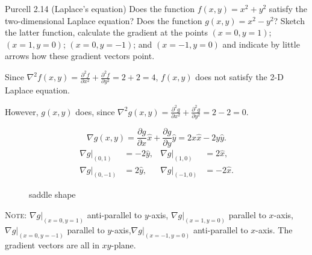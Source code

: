 \documentclass{esg8022pset}
\begin{document}
\begin{problem}{Purcell 2.14 (Laplace's equation)}
  Does the function $f(x, y) = x^2 + y^2$ satisfy the two-dimensional
  Laplace equation? Does the function $g(x, y) = x^2 - y^2$? 
  Sketch the latter function, calculate the gradient at the points $(x = 0, y = 1)$;
  $(x = 1, y = 0)$; $(x = 0, y = -1)$; and $(x = -1, y = 0)$ and indicate
  by little arrows how these gradient vectors point.  
\end{problem}
\begin{solution}
  Since $\nabla^2 f(x,y)=\frac{\partial^2 f}{\partial x^2}+\frac{\partial^2 f}{\partial y^2}=2+2=4$, $f(x,y)$ does not satisfy the 2-D Laplace equation.
  
  However, $g(x,y)$ does, since $\nabla^2 g(x,y)=\frac{\partial^2 g}{\partial x^2}+\frac{\partial^2 g}{\partial y^2}=2-2=0$.

  $$\nabla g(x,y)=\frac{\partial g}{\partial x} \hat{x} + \frac{\partial g}{\partial y} \hat{y}=2x\hat{x}-2y\hat{y}.$$
  \begin{align*}
    \nabla g|_{(0,1)} & = -2\hat{y}, & \nabla g|_{(1,0)} & = 2\hat{x}, \\
    \nabla g|_{(0,-1)} & = 2\hat{y}, & \nabla g|_{(-1,0)} & = -2\hat{x}.
  \end{align*}
   
  \begin{figure}[ht]
    \centering
    \caption{saddle shape}
    \label{fig:saddle}
  \end{figure}

  \noindent\textsc{Note}: $\nabla g|_{(x=0,y=1)}$ anti-parallel to $y$-axis, $\nabla
  g|_{(x=1,y=0)}$ parallel to $x$-axis, $\nabla g|_{(x=0,y=-1)}$ parallel
  to $y$-axis,$\nabla g|_{(x=-1,y=0)}$ anti-parallel to $x$-axis.  The
  gradient vectors are all in $xy$-plane.
\end{solution}
\end{document}
